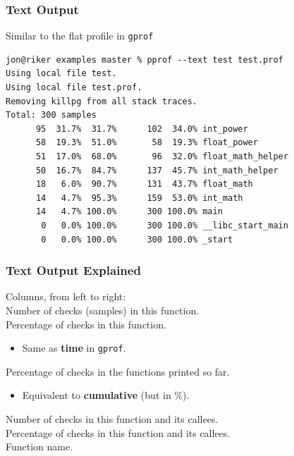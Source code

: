 \begin{frame}[fragile]
  \frametitle{Text Output}


\begin{changemargin}{1.5cm}

    Similar to the flat profile in {\tt gprof}

  \begin{lstlisting}
jon@riker examples master % pprof --text test test.prof 
Using local file test.
Using local file test.prof.
Removing killpg from all stack traces.
Total: 300 samples
      95  31.7%  31.7%      102  34.0% int_power
      58  19.3%  51.0%       58  19.3% float_power
      51  17.0%  68.0%       96  32.0% float_math_helper
      50  16.7%  84.7%      137  45.7% int_math_helper
      18   6.0%  90.7%      131  43.7% float_math
      14   4.7%  95.3%      159  53.0% int_math
      14   4.7% 100.0%      300 100.0% main
       0   0.0% 100.0%      300 100.0% __libc_start_main
       0   0.0% 100.0%      300 100.0% _start
  \end{lstlisting}
  
  \end{changemargin}
\end{frame}

\begin{frame}
  \frametitle{Text Output Explained}


\begin{changemargin}{1.5cm}
  
    Columns, from left to right:\\[1em]

    Number of checks (samples) in this function.\\
    Percentage of checks in this function.
      \begin{itemize}
        \item Same as {\bf time} in {\tt gprof}.\\[1em]
      \end{itemize}
    Percentage of checks in the functions printed so far.
      \begin{itemize}
        \item Equivalent to {\bf cumulative} (but in \%).\\[1em]
      \end{itemize}
    Number of checks in this function and its callees.\\
    Percentage of checks in this function and its callees.\\
    Function name.
    \end{changemargin}
\end{frame}

